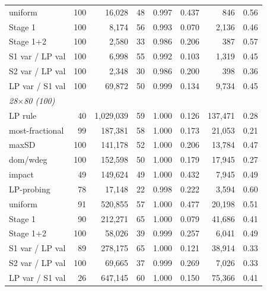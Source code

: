 \begin{table}[t]
\begin{tabular}{lrrrrrrr}
uniform & 100 & 16,028 & 48 & 0.997 & 0.437 & 846 & 0.56 \\
Stage 1 & 100 & 8,174 & 56 & 0.993 & 0.070 & 2,136 & 0.46 \\
Stage 1+2 & 100 & 2,580 & 33 & 0.986 & 0.206 & 387 & 0.57 \\
S1 var / LP val & 100 & 6,998 & 55 & 0.992 & 0.103 & 1,319 & 0.45 \\
S2 var / LP val & 100 & 2,348 & 30 & 0.986 & 0.200 & 398 & 0.36 \\
LP var / S1 val & 100 & 69,872 & 50 & 0.999 & 0.134 & 9,734 & 0.45 \\
\midrule
\multicolumn{8}{l}{\emph{28$\times$80 (100)}} \\
LP rule & 40 & 1,029,039 & 59 & 1.000 & 0.126 & 137,471 & 0.28 \\
most-fractional & 99 & 187,381 & 58 & 1.000 & 0.173 & 21,053 & 0.21 \\
maxSD & 100 & 141,178 & 52 & 1.000 & 0.206 & 13,784 & 0.47 \\
dom/wdeg & 100 & 152,598 & 50 & 1.000 & 0.179 & 17,945 & 0.27 \\
impact & 49 & 149,624 & 49 & 1.000 & 0.432 & 7,945 & 0.49 \\
LP-probing & 78 & 17,148 & 22 & 0.998 & 0.222 & 3,594 & 0.60 \\
uniform & 91 & 520,855 & 57 & 1.000 & 0.477 & 20,198 & 0.51 \\
Stage 1 & 90 & 212,271 & 65 & 1.000 & 0.079 & 41,686 & 0.41 \\
Stage 1+2 & 100 & 58,026 & 39 & 0.999 & 0.257 & 6,041 & 0.49 \\
S1 var / LP val & 89 & 278,175 & 65 & 1.000 & 0.121 & 38,914 & 0.33 \\
S2 var / LP val & 100 & 69,665 & 37 & 0.999 & 0.269 & 7,026 & 0.33 \\
LP var / S1 val & 26 & 647,145 & 60 & 1.000 & 0.150 & 75,366 & 0.41 \\
\bottomrule
\end{tabular}
\end{table}